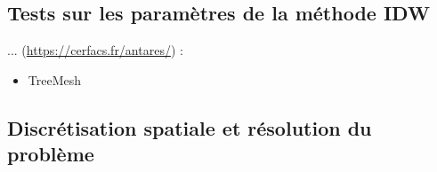 \subsection{Tests sur les paramètres de la méthode IDW}




... (\url{https://cerfacs.fr/antares/}) : 


\begin{itemize}
    \item TreeMesh 
\end{itemize}


\subsection{Discrétisation spatiale et résolution du problème}